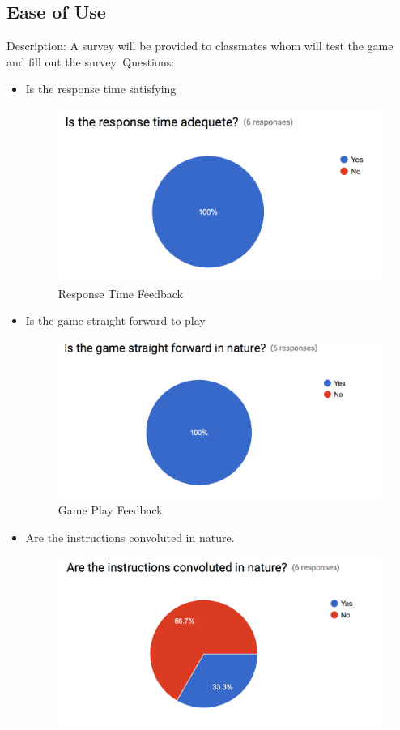\documentclass{article}
\begin{document}
\subsection{Ease of Use}
\label{sec:4.2}
Description: A survey will be provided to classmates whom will test the game 
and fill out the survey.  \newline
Questions: 
\begin{itemize}
\item Is the response time satisfying
\begin{figure}[H]
	\centering
	\includegraphics[width=\textwidth]{./Figures/13.png}
	\caption{Response Time Feedback}
\end{figure}
\item Is the game straight forward to play
\begin{figure}[H]
	\centering
	\includegraphics[width=\textwidth]{./Figures/14.png}
	\caption{Game Play Feedback}
\end{figure}
\item Are the instructions convoluted in nature.
\begin{figure}[H]
	\centering
	\includegraphics[width=\textwidth]{./Figures/16.png}

\end{figure}
\end{itemize}
\end{document}
